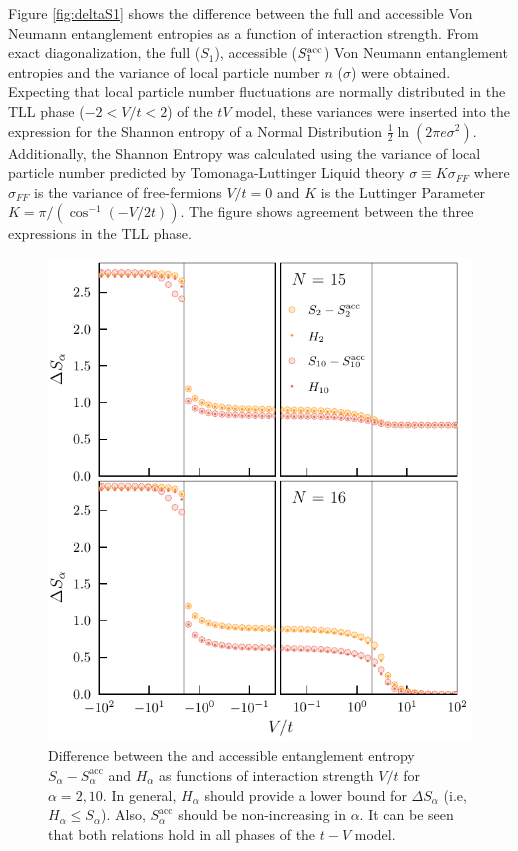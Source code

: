 %
Figure \ref{fig:deltaS1} shows the difference between the full and accessible Von Neumann entanglement entropies as a function of interaction strength. From exact diagonalization, the full ($S_1$), accessible ($S_{1}^{\rm acc}$) Von Neumann entanglement entropies and the variance of local particle number $n$ ($\sigma$) were obtained. Expecting that local particle number fluctuations are normally distributed in the TLL phase ($-2 < V/t < 2$) of the $tV$ model, these variances were inserted into the expression for the Shannon entropy of a Normal Distribution $\frac{1}{2}\ln{\left( 2\pi e \sigma^2 \right)}$. Additionally, the Shannon Entropy was calculated using the variance of local particle number predicted by Tomonaga-Luttinger Liquid theory $\sigma \equiv K\sigma_{FF}$ where $\sigma_{FF}$ is the variance of free-fermions $V/t = 0$ and $K$ is the Luttinger Parameter $K = \pi/(\cos^{-1}\left( -V/2t \right))$. The figure shows agreement between the three expressions in the TLL phase.


\begin{figure}[htp]
\begin{center}
\includegraphics[width=1.0\columnwidth]{higherAlphaDeltaS_N15N16.pdf}
\end{center}
\caption{Difference between the \ren and accessible entanglement entropy $S_{\alpha} - S_{\alpha}^{\mathrm{acc}}$ and $H_{\alpha}$ as functions of interaction strength $V/t$ for $\alpha=2,10$. In general, $H_{\alpha}$ should provide a lower bound for $\Delta S_{\alpha}$ (i.e, $H_{\alpha} \leq S_{\alpha}$). Also, $S_{\alpha}^{\mathrm{acc}}$ should be non-increasing in $\alpha$. It can be seen that both relations hold in all phases of the $t-V$ model.}
\label{fig:deltaS_alpha}
\end{figure}

